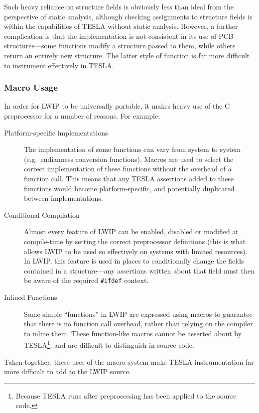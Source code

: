 Such heavy reliance on structure fields is obviously less than ideal
from the perspective of static analysis, although checking assignments
to structure fields is within the capabilities of TESLA without static
analysis. However, a further complication is that the implementation is
not consistent in its use of PCB structures---some functions modify a
structure passed to them, while others return an entirely new structure.
The latter style of function is far more difficult to instrument
effectively in TESLA.

\subsubsection{Macro Usage}

In order for LWIP to be universally portable, it makes heavy use of the
C preprocessor for a number of reasons. For example:
\begin{description}
  \item[Platform-specific implementations] The implementation of some
  functions can vary from system to system (e.g.\ endianness conversion
  functions). Macros are used to select the correct implementation of
  these functions without the overhead of a function call. This means
  that any TESLA assertions added to these functions would become
  platform-specific, and potentially duplicated between implementations.

  \item[Conditional Compilation] Almost every feature of LWIP can be
  enabled, disabled or modified at compile-time by setting the correct
  preprocessor definitions (this is what allows LWIP to be used so
  effectively on systems with limited resources). In LWIP, this feature
  is used in places to conditionally change the fields contained in a
  structure---any assertions written about that field must then be aware
  of the required \texttt{#ifdef} context.

  \item[Inlined Functions] Some simple ``functions'' in LWIP are expressed using
    macros to guarantee that there is no function call overhead, rather than
    relying on the compiler to inline them. These function-like macros cannot be
    asserted about by TESLA\footnote{Because TESLA runs after preprocessing has
    been applied to the source code.}, and are difficult to distinguish in source code.
\end{description}

Taken together, these uses of the macro system make TESLA
instrumentation far more difficult to add to the LWIP source.

